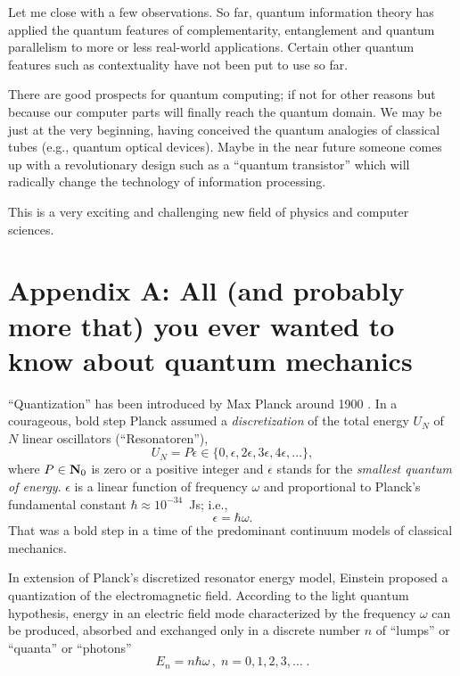 \documentclass [11pt]{llncs}
\begin{document}
Let me close with a few observations.
So far, quantum information theory has applied the quantum features of
complementarity, entanglement and quantum parallelism to more or less real-world applications.
Certain other quantum features such as contextuality have not been put to use so far.

There are good prospects for quantum computing; if not for other reasons but because our computer parts will
finally reach the quantum domain.
We may be just at the very beginning, having conceived the quantum analogies of classical
tubes (e.g., quantum optical devices).
Maybe in the near future someone comes up with a revolutionary design such as a ``quantum transistor''
which will radically change the technology of information processing.

This is a very exciting and challenging new field of physics and computer sciences.



\section*{Appendix A: All (and probably more that) you ever wanted to know about quantum mechanics}

 \label{appendix-a}
``Quantization'' has been introduced by Max Planck around 1900 \cite{planck:1901,planck:1901b,planck:1901a}.
In a courageous, bold step Planck assumed
a {\em discretization} of the total energy
$U_N$ of
$N$
linear oscillators (``Resonatoren''),
$$
U_N= P\epsilon \in \{ 0,\epsilon ,2\epsilon ,3\epsilon ,4\epsilon
,\ldots
\}
,$$
where $P\in {\bf N}_0$ is zero or a positive
integer and $\epsilon$ stands for the {\em smallest quantum of energy}.
$\epsilon$ is a linear function of frequency $\omega$ and proportional
to Planck's fundamental constant
$\hbar \approx 10^{-34}$~Js; i.e.,
$$
\epsilon = \hbar \omega
.$$
That was a bold step in a time of the predominant continuum models of
classical mechanics.


In extension of Planck's discretized resonator energy model,
Einstein \cite{ein-5} proposed a quantization of the
electromagnetic field.
According to the light quantum hypothesis,
energy  in an electric field mode
characterized by the frequency $\omega$ can be produced, absorbed and
exchanged only in a discrete number $n$ of ``lumps'' or ``quanta'' or
``photons''
$$E_n=n\hbar \omega \, ,\; n=0,1,2,3,\ldots \; .$$
\end{document}
